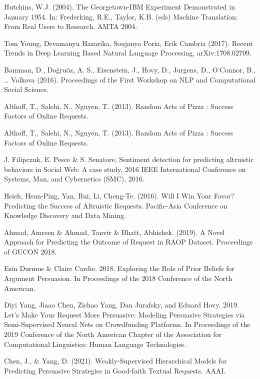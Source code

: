 \documentclass[runningheads]{llncs}
\begin{document}
\begin{thebibliography}{8}
Hutchins, W.J. (2004). The Georgetown-IBM Experiment Demonstrated in January 1954. In: Frederking, R.E., Taylor, K.B. (eds) Machine Translation: From Real Users to Research. AMTA 2004.

Tom Young, Devamanyu Hazarika, Soujanya Poria, Erik Cambria (2017). Recent Trends in Deep Learning Based Natural Language Processing. arXiv:1708.02709.

Bamman, D., Doğruöz, A. S., Eisenstein, J., Hovy, D., Jurgens, D., O’Connor, B., … Volkova (2016). Proceedings of the First Workshop on NLP and Computational Social Science.

Althoff, T., Salehi, N., Nguyen, T. (2013). Random Acts of Pizza : Success Factors of Online Requests.

Althoff, T., Salehi, N., Nguyen, T. (2013). Random Acts of Pizza : Success Factors of Online Requests.

J. Filipczuk, E. Pesce \& S. Senatore, Sentiment detection for predicting altruistic behaviors in Social Web: A case study, 2016 IEEE International Conference on Systems, Man, and Cybernetics (SMC), 2016.

Hsieh, Hsun-Ping, Yan, Rui, Li, Cheng-Te. (2016). Will I Win Your Favor? Predicting the Success of Altruistic Requests. Pacific-Asia Conference on Knowledge Discovery and Data Mining.

Ahmad, Amreen \& Ahmad, Tanvir & Bhatt, Abhishek. (2019). A Novel Approach for Predicting the Outcome of Request in RAOP Dataset. Proceedings of GUCON 2018.

Esin Durmus \& Claire Cardie. 2018. Exploring the Role of Prior Beliefs for Argument Persuasion. In Proceedings of the 2018 Conference of the North American.

Diyi Yang, Jiaao Chen, Zichao Yang, Dan Jurafsky, and Eduard Hovy. 2019. Let’s Make Your Request More Persuasive: Modeling Persuasive Strategies via Semi-Supervised Neural Nets on Crowdfunding Platforms. In Proceedings of the 2019 Conference of the North American Chapter of the Association for Computational Linguistics: Human Language Technologies.

Chen, J., \& Yang, D. (2021). Weakly-Supervised Hierarchical Models for Predicting Persuasive Strategies in Good-faith Textual Requests. AAAI.


\end{thebibliography}
\end{document}
